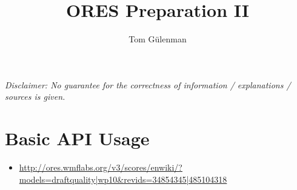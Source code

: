 \documentclass[12pt,a4paper]{article}
\title{ORES Preparation II}
\author{Tom Gülenman}
\begin{document}
\maketitle
\textit{Disclaimer: No guarantee for the correctness of information / explanations / sources is given.}
\section{Basic API Usage}
\begin{itemize}
\item \url{http://ores.wmflabs.org/v3/scores/enwiki/?models=draftquality|wp10&revids=34854345|485104318}
\end{itemize}
\end{document}
